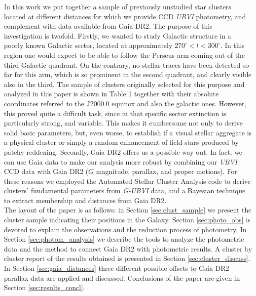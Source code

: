 \documentclass[draft]{aa}
\begin{document}
In this work we put together a sample of previously unstudied star clusters
located at different distances for which we provide CCD \textit{UBVI}
photometry, and complement with data available from Gaia DR2. The purpose of
this investigation is twofold. Firstly, we wanted to study Galactic structure in
a poorly known Galactic sector, located at approximately $270^\circ < l <
300^\circ$. In this region one would expect to be able to follow the Perseus arm
coming out of the third Galactic quadrant. On the contrary, no stellar traces
have been detected so far for this arm, which is so prominent in the second
quadrant, and clearly visible also in the third. The sample of clusters
originally selected for this purpose and analyzed in this paper is shown in
Table 1 together with their absolute coordinates referred to the J2000.0 equinox
and also the galactic ones. However, this proved quite a difficult task, since
in that specific sector extinction is particularly strong, and variable. This
makes it cumbersome not only to derive solid basic parameters, but, even worse,
to establish if a visual stellar aggregate is a physical cluster or simply a
random enhancement of field stars produced by patchy reddening.
%
Secondly, Gaia DR2 offers us a possible way out. In fact, we can
use Gaia data to make our analysis more robust by combining our \textit{UBVI}
CCD data with Gaia DR2 ($G$ magnitude, parallax, and proper motions).
For these reasons we employed the Automated Stellar
Cluster Analysis code \citep[\texttt{ASteCA};][]{Perren_2015} to derive
clusters' fundamental parameters from \textit{G-UBVI} data, and a Bayesian
technique to extract membership and distances from Gaia DR2.\\

The layout of the paper is as follows: in Section \ref{sec:clust_sample} we
present the cluster sample indicating their positions in the Galaxy.
Section \ref{sec:photo_obs} is devoted to explain the observations and the
reduction process of photometry. In Section \ref{sec:photom_analysis} we
describe the tools to analyze the photometric data and the method to connect
Gaia DR2 with photometric results. A cluster by cluster report of the results
obtained is presented in Section \ref{sec:cluster_discuss}. In Section
\ref{sec:gaia_distances} three different possible offsets to Gaia DR2 parallax
data are applied and discussed. Conclusions of the paper are given in Section 
\ref{sec:results_concl}.




\end{document}
